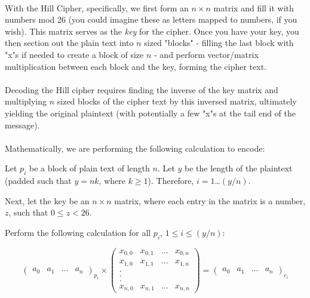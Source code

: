 \documentclass[12pt,a4paper]{article}
\begin{document}
\paragraph{}
With the Hill Cipher, specifically, we first form an $n \times n$ matrix and fill it 
with numbers mod 26 (you could imagine these as letters mapped to numbers, if 
you wish).  This matrix serves as the \textit{key} for the cipher.  Once you 
have your key, you then section out the plain text into $n$ sized "blocks" - 
filling the last block with "x"s if needed to create a block of size $n$ - and 
perform vector/matrix multiplication between each block and 
the key, forming the cipher text.

\paragraph{}
Decoding the Hill cipher requires finding the inverse of the key matrix and 
multiplying $n$ sized blocks of the cipher text by this inversed matrix, 
ultimately yielding the original plaintext (with potentially a few "x"s at the 
tail end of the message).

\paragraph{}
Mathematically, we are performing the following calculation to encode:

Let $p_i$ be a block of plain text of length $n$.  Let $y$ be the length 
of the plaintext (padded such that $y = nk$, where $k \ge 1$).  Therefore, 
$i = 1$\ldots$(y/n)$.

Next, let the key be an $n \times n$ matrix, where each entry in the matrix 
is a number, $z$, such that $0 \le z < 26$.

Perform the following calculation for all $p_i$, $1 \le i \le (y/n)$:

$$
\begin{pmatrix}
  a_0 & a_1 & \ldots & a_n
\end{pmatrix}
_{p_i} \times
\begin{pmatrix}
  x_{0,0} & x_{0,1} & \ldots & x_{0,n}\\
  x_{1,0} & x_{1,1} & \ldots & x_{1,n}\\
  . \\
  . \\
  . \\
  x_{n,0} & x_{n,1} & \ldots & x_{n,n}
\end{pmatrix}
=
\begin{pmatrix}
  a_0 & a_1 & \ldots & a_n
\end{pmatrix}
_{c_i}
$$
\end{document}
